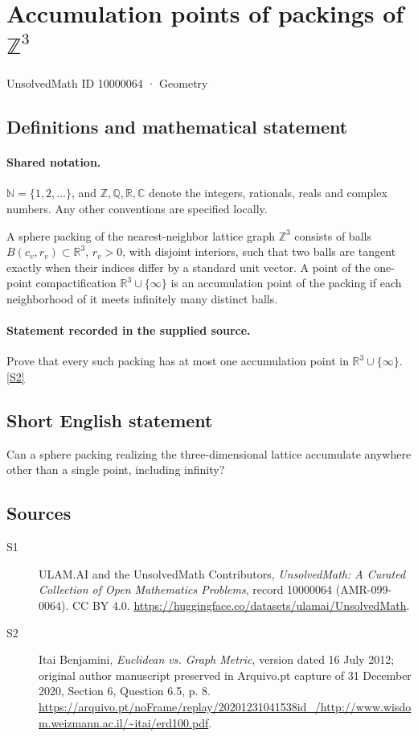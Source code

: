 \documentclass[11pt]{article}
\newcommand{\sref}[2]{\hyperlink{source:#1:#2}{[S#2]}}
\begin{document}
\setcounter{section}{10000063}
\section{Accumulation points of packings of $\mathbb{Z}^3$}\label{10000064}
{\small\sffamily UnsolvedMath ID 10000064 · Geometry}
\subsection{Definitions and mathematical statement}

\paragraph{Shared notation.}$\mathbb N=\{1,2,\ldots\}$, and $\mathbb Z,\mathbb Q,\mathbb R,\mathbb C$ denote the integers, rationals, reals and complex numbers. Any other conventions are specified locally.


A sphere packing of the nearest-neighbor lattice graph $\mathbb Z^3$ consists of balls $B(c_v,r_v)\subset\mathbb R^3$, $r_v>0$, with disjoint interiors, such that two balls are tangent exactly when their indices differ by a standard unit vector. A point of the one-point compactification $\mathbb R^3\cup\{\infty\}$ is an accumulation point of the packing if each neighborhood of it meets infinitely many distinct balls.
\paragraph{Statement recorded in the supplied source.}
Prove that every such packing has at most one accumulation point in $\mathbb R^3\cup\{\infty\}$. \sref{10000064}{2}
\subsection{Short English statement}
Can a sphere packing realizing the three-dimensional lattice accumulate anywhere other than a single point, including infinity?
\subsection{Sources}
\begin{description}
\item[\hypertarget{source:10000064:1}{S1}] ULAM.AI and the UnsolvedMath Contributors, \emph{UnsolvedMath: A Curated Collection of Open Mathematics Problems}, record 10000064 (AMR-099-0064). CC BY 4.0. \url{https://huggingface.co/datasets/ulamai/UnsolvedMath}.
\item[\hypertarget{source:10000064:2}{S2}] Itai Benjamini, \emph{Euclidean vs. Graph Metric}, version dated 16 July 2012; original author manuscript preserved in Arquivo.pt capture of 31 December 2020, Section 6, Question 6.5, p. 8. \url{https://arquivo.pt/noFrame/replay/20201231041538id_/http://www.wisdom.weizmann.ac.il/~itai/erd100.pdf}.
\end{description}
\label{end:10000064}
\end{document}
